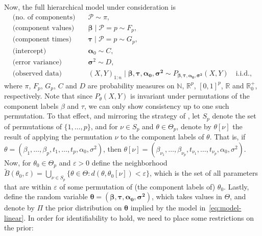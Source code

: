 \documentclass{article}
\numberwithin{equation}{section}
\theoremstyle{plain}
\renewcommand{\epsilon}{\varepsilon}
\newcommand{\N}{\mathbb{N}}
\newcommand{\R}{\mathbb{R}}
\begin{document}
Now, the full hierarchical model under consideration is
\begin{equation}\label{eq:model-linear}
  \begin{aligned}
    \text{(no.\ of components)}\quad & \mathcal P \sim \pi,                                                                                                          \\
    \text{(component values)}\quad   & \bm \beta \mid \mathcal P=p \sim F_p,                                                                                         \\
    \text{(component times)}\quad    & \bm \tau \mid \mathcal P=p \sim G_p,                                                                                          \\
    \text{(intercept)}\quad          & \bm \alpha_0 \sim C,                                                                                                          \\
    \text{(error variance)}\quad     & \bm \sigma^2 \sim D,                                                                                                          \\
    \text{(observed data)}\quad      & (X,Y)_{1:n} \mid \bm{\beta, \tau, \alpha_0, \sigma^2} \sim P_{\bm{\beta, \tau, \alpha_0, \sigma^2}}(X,Y) \quad \text{i.i.d.},
  \end{aligned}
\end{equation}
where \(\pi\), \(F_p\), \(G_p\), \(C\) and \(D\) are probability measures on \(\N\), \(\R^p\), \([0,1]^p\), \(\R\) and \(\R^+_0\), respectively. Note that since \(P_\theta(X,Y)\) is invariant under permutations of the component labels \(\beta\) and \(\tau\), we can only show consistency up to one such permutation. To that effect, and mirroring the strategy of \citet{miller2023consistency}, let \(S_p\) denote the set of permutations of \(\{1,\dots,p\}\), and for \(\nu\in S_p\) and \(\theta \in \Theta_p\), denote by \(\theta[\nu]\) the result of applying the permutation \(\nu\) to the component labels of \(\theta\). That is, if \(\theta=(\beta_1,\dots,\beta_p, t_1,\dots, t_p,\alpha_0,\sigma^2)\), then \(\theta[\nu]=(\beta_{\nu_1},\dots,\beta_{\nu_p}, t_{\nu_1},\dots, t_{\nu_p},\alpha_0,\sigma^2)\). Now, for \(\theta_0\in\Theta_p\) and \(\epsilon>0\) define the neighborhood \(\tilde{B}(\theta_0, \epsilon)  =\bigcup_{\nu\in S_p} \{\theta \in \Theta: d(\theta, \theta_0[\nu]) < \epsilon \}\), which is the set of all parameters that are within \(\epsilon\) of some permutation of (the component labels of) \(\theta_0\). Lastly, define the random variable \(\bm \theta = (\bm{\beta, \tau, \alpha_0, \sigma^2} )\), which takes values in \(\Theta\), and denote by \(\Pi\) the prior distribution on \(\bm\theta\) implied by the model in~\eqref{eq:model-linear}. In order for identifiability to hold, we need to place some restrictions on the prior:
\end{document}
